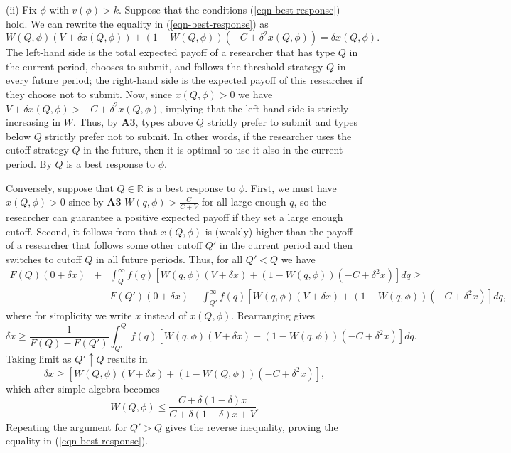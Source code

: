 \documentclass[12pt]{article}
\theoremstyle{plain}
\theoremstyle{definition}
\theoremstyle{remark}
\def\RR{\mathbb{R}}
\begin{document}
\noindent (ii) Fix $\phi$ with $v(\phi)> k$. Suppose that the conditions (\ref{eqn-best-response}) hold. We can rewrite the equality in (\ref{eqn-best-response}) as 
    $$W(Q,\phi)(V+\delta x(Q,\phi)) + (1-W(Q,\phi))(-C+\delta^2 x(Q,\phi))= \delta x(Q,\phi).$$
    The left-hand side is the total expected payoff of a researcher that has type $Q$ in the current period, chooses to submit, and follows the threshold strategy $Q$ in every future period; the right-hand side is the expected payoff of this researcher if they choose not to submit. Now, since $x(Q,\phi)> 0$ we have $V+\delta x(Q,\phi) > -C+\delta^2 x(Q,\phi)$, implying that the left-hand side is strictly increasing in $W$. Thus, by \textbf{A3}, types above $Q$ strictly prefer to submit and types below $Q$ strictly prefer not to submit. In other words, if the researcher uses the cutoff strategy $Q$ in the future, then it is optimal to use it also in the current period. By \citet[Theorem 1]{blackwell1962discrete} $Q$ is a best response to $\phi$.

    Conversely, suppose that $Q\in \RR$ is a best response to $\phi$. First, we must have $x(Q,\phi)> 0$ since by \textbf{A3} $W(q,\phi)>\frac{C}{C+V}$ for all large enough $q$, so the researcher can guarantee a positive expected payoff if they set a large enough cutoff. Second, it follows from \citet[Theorem 2]{blackwell1962discrete} that $x(Q,\phi)$ is (weakly) higher than the payoff of a researcher that follows some other cutoff $Q'$ in the current period and then switches to cutoff $Q$ in all future periods. Thus, for all $Q'<Q$ we have 
    \begin{eqnarray*}
    F(Q)(0+\delta x) &+& \int_Q^{\infty} f(q)\left[W(q,\phi)(V+\delta x) + (1-W(q,\phi))(-C+\delta^2 x) \right] dq \ge \\
    & & F(Q')(0+\delta x) + \int_{Q'}^{\infty} f(q)\left[W(q,\phi)(V+\delta x) + (1-W(q,\phi))(-C+\delta^2 x) \right] dq,
    \end{eqnarray*}
    where for simplicity we write $x$ instead of $x(Q,\phi)$. Rearranging gives
    $$\delta x \ge \frac{1}{F(Q)-F(Q')} \int_{Q'}^Q  f(q)\left[W(q,\phi)(V+\delta x)+(1-W(q,\phi))(-C+\delta^2 x) \right]dq.$$
    Taking limit as $Q'\uparrow Q$ results in 
    $$\delta x \ge \left[W(Q,\phi)(V+\delta x)+(1-W(Q,\phi))(-C+\delta^2 x) \right],$$
    which after simple algebra becomes 
    $$W(Q,\phi)\le \frac{C+\delta(1-\delta)x}{C+\delta(1-\delta)x+V}.$$
    Repeating the argument for $Q'>Q$ gives the reverse inequality, proving the equality in (\ref{eqn-best-response}).  
\end{document}
